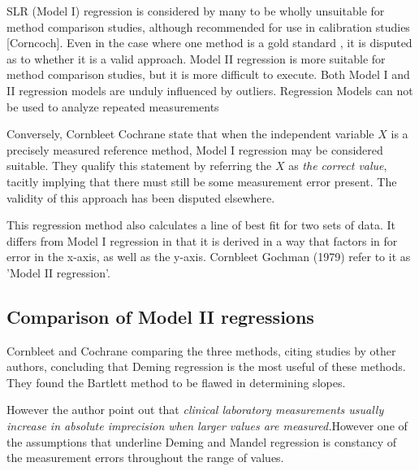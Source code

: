 \documentclass[12pt, a4paper]{report}
\theoremstyle{plain}
\theoremstyle{definition}
\theoremstyle{remark}
\begin{document}
SLR (Model I) regression is considered by many \citet{BA83,CornCoch,ludbrook97} to be wholly unsuitable for
method comparison studies, although recommended for use in calibration studies [Corncoch]. Even in the case where one
method is a gold standard , it is disputed as to whether it is a valid approach. Model II regression is more suitable for method comparison studies, but it is more difficult to execute. Both Model I and II regression models are unduly influenced by outliers. Regression Models can not be used to analyze repeated measurements


Conversely, Cornbleet Cochrane state that when the independent
variable $X$ is a precisely measured reference method, Model I
regression may be considered suitable. They qualify this statement
by referring the $X$ as \emph{the correct value}, tacitly
implying that there must still be some measurement error present.
The validity of this approach has been disputed elsewhere.

This regression method also calculates a line of best fit for two sets of data. It differs from Model I regression in that it is derived in a way that factors in for error in the x-axis, as well as the y-axis. Cornbleet Gochman (1979) refer to it as 'Model II regression'.

\subsection{Comparison of Model II regressions}
Cornbleet and Cochrane comparing the three methods, citing studies by other authors, concluding that Deming regression is the most useful of these methods. They found the Bartlett method to be
flawed in determining slopes.

However the author point out that \emph{ clinical laboratory measurements usually increase in absolute imprecision when larger values are measured.}However one of the assumptions that underline Deming and Mandel regression is constancy of the measurement errors throughout the range of values.


\end{document}
